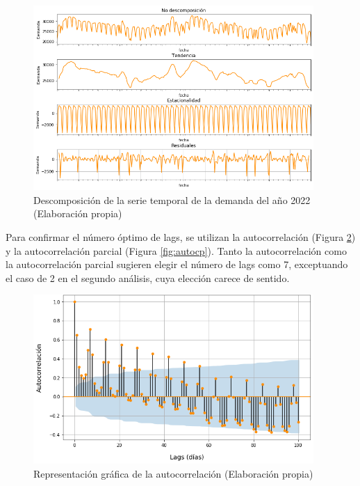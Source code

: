 \documentclass[12pt,a4paper]{report}
\begin{document}
\begin{figure}[H]
    \centering
    \includegraphics[width=0.95\textwidth]{Images/tfm-3.6.png}
    \caption{Descomposición de la serie temporal de la demanda del año 2022 (Elaboración propia)}
    \label{fig:desc_2022}
\end{figure}



Para confirmar el número óptimo de lags, se utilizan la autocorrelación (Figura \ref{fig:autoc}) y la autocorrelación parcial (Figura \ref{fig:autocp}). Tanto la autocorrelación como la autocorrelación parcial sugieren elegir el número de lags como 7, exceptuando el caso de 2 en el segundo análisis, cuya elección carece de sentido.

\begin{figure}[H]
    \centering
    \includegraphics[width=0.95\textwidth]{Images/tfm-3.7A.png}
    \caption{Representación gráfica de la autocorrelación (Elaboración propia)}
    \label{fig:autoc}
\end{figure}
\end{document}
